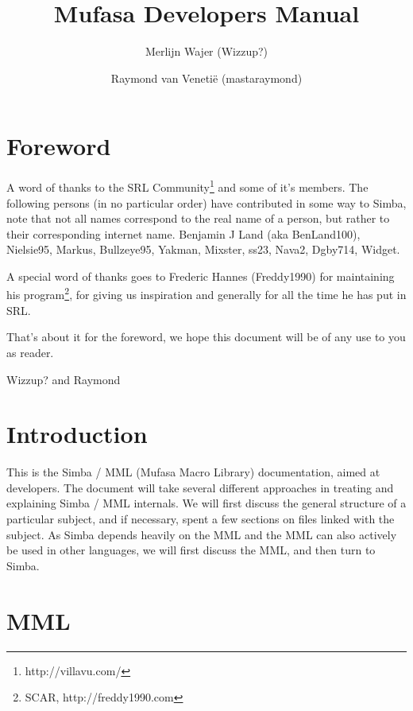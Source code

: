\documentclass[a4paper, 10pt]{report} %
\begin{document}
\title{Mufasa Developers Manual}
\author{Merlijn Wajer (Wizzup?) \and Raymond van Veneti\"{e} (mastaraymond)}
\maketitle
\tableofcontents
% 

\chapter{Foreword}

A word of thanks to the SRL Community\footnote{http://villavu.com/} and some of
it's members.
The following persons (in no particular order) have contributed in some way to
Simba, note that not all names correspond to the real name of a person, but
rather to their corresponding internet name.
Benjamin J Land (aka BenLand100), Nielsie95, Markus, Bullzeye95,
Yakman, Mixster, ss23, Nava2, Dgby714, Widget.

A special word of thanks goes to Frederic Hannes (Freddy1990) for maintaining
his program\footnote{SCAR, http://freddy1990.com}, for giving us inspiration
and generally for all the time he has put in SRL.

That's about it for the foreword, we hope this document will be of any use to
you as reader.

Wizzup? and Raymond

\chapter{Introduction}

This is the Simba / MML (Mufasa Macro Library) documentation, aimed at
developers. The document will take several different approaches in treating and
explaining Simba / MML internals. We will first discuss the general 
structure of a particular subject, and if necessary, spent a few sections
on files linked with the subject. 
As Simba depends heavily on the MML and the MML can also actively be used in 
other languages, we will first discuss the MML, and then turn to Simba.

\chapter{MML}
\end{document}
